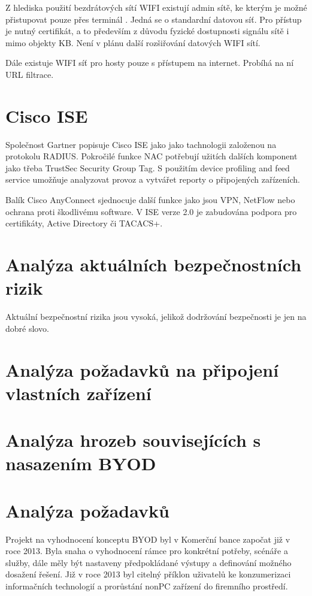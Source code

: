 Z hlediska použití bezdrátových sítí WIFI existují admin sítě, ke kterým je možné přistupovat pouze přes terminál . Jedná se o standardní datovou síť. Pro přístup je nutný certifikát, a to především z důvodu fyzické dostupnosti signálu sítě i mimo objekty KB. Není v plánu další rozšiřování datových WIFI sítí.  

Dále existuje WIFI síť pro hosty pouze s přístupem na internet. Probíhá na ní URL filtrace.

\section{Cisco ISE}
Společnost Gartner  popisuje Cisco ISE jako jako tachnologii založenou na protokolu RADIUS. Pokročilé funkce NAC potřebují užitích dalších komponent jako třeba TrustSec Security Group Tag. S použitím device profiling and feed service umožňuje analyzovat provoz a vytvářet reporty o připojených zařízeních.

Balík Cisco AnyConnect sjednocuje další funkce jako jsou VPN, NetFlow nebo ochrana proti škodlivému software. V ISE verze 2.0 je zabudována podpora pro certifikáty, Active Directory či TACACS+.

\section{Analýza aktuálních bezpečnostních rizik}
Aktuální bezpečnostní rizika jsou vysoká, jelikož dodržování bezpečnosti je jen na dobré slovo. 

\section{Analýza požadavků na připojení vlastních zařízení} 

\section{Analýza hrozeb souvisejících s nasazením BYOD}

\section{Analýza požadavků}
Projekt na vyhodnocení konceptu BYOD byl v Komerční bance započat již v roce 2013. Byla snaha o vyhodnocení rámce pro konkrétní potřeby, scénáře a služby, dále měly být nastaveny předpokládané výstupy a definování možného dosažení řešení. Již v roce 2013 byl citelný příklon uživatelů ke konzumerizaci informačních technologií a prorůstání nonPC zařízení do firemního prostředí.

